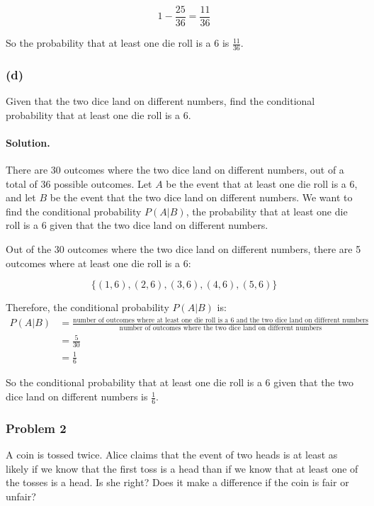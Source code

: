$$1 - \frac{25}{36} = \frac{11}{36}$$

So the probability that at least one die roll is a 6 is $\frac{11}{36}$.

\subsubsection{(d)} Given that the two dice land on different numbers, find the conditional probability that at least one die roll is a 6.

\paragraph{Solution.} There are 30 outcomes where the two dice land on different numbers, out of a total of 36 possible outcomes. Let $A$ be the event that at least one die roll is a 6, and let $B$ be the event that the two dice land on different numbers. We want to find the conditional probability $P(A|B)$, the probability that at least one die roll is a 6 given that the two dice land on different numbers.

Out of the 30 outcomes where the two dice land on different numbers, there are 5 outcomes where at least one die roll is a 6:

$$\{(1,6), (2,6), (3,6), (4,6), (5,6)\}$$

Therefore, the conditional probability $P(A|B)$ is:
\begin{align*}
    P(A|B) & = \frac{\text{number of outcomes where at least one die roll is a 6 and the two dice land on different numbers}}{\text{number of outcomes where the two dice land on different numbers}} \\
           & = \frac{5}{30}                                                                                                                                                                           \\
           & = \frac{1}{6}
\end{align*}

So the conditional probability that at least one die roll is a 6 given that the two dice land on different numbers is $\frac{1}{6}$.

\newpage
\subsubsection{Problem 2} A coin is tossed twice. Alice claims that the event of two heads is at least as likely if we know that the first toss is a head than if we know that at least one of the tosses is a head. Is she right? Does it make a difference if the coin is fair or unfair?

